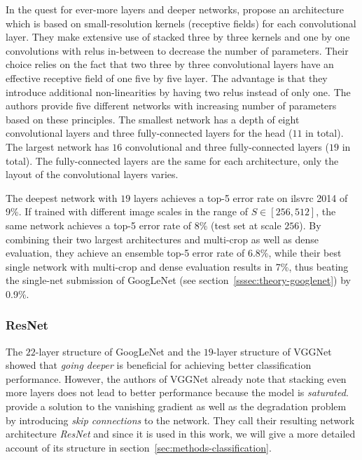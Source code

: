 \documentclass[final]{vutinfth} %
\begin{document}
In the quest for ever-more layers and deeper networks,
\textcite{simonyan2015} propose an architecture which is based on
small-resolution kernels (receptive fields) for each convolutional
layer. They make extensive use of stacked three by three kernels and
one by one convolutions with \glspl{relu} in-between to decrease the
number of parameters. Their choice relies on the fact that two three
by three convolutional layers have an effective receptive field of one
five by five layer. The advantage is that they introduce additional
non-linearities by having two \glspl{relu} instead of only one. The
authors provide five different networks with increasing number of
parameters based on these principles. The smallest network has a depth
of eight convolutional layers and three fully-connected layers for the
head ($11$ in total). The largest network has $16$ convolutional and
three fully-connected layers ($19$ in total). The fully-connected
layers are the same for each architecture, only the layout of the
convolutional layers varies.

The deepest network with $19$ layers achieves a top-5 error rate on
\gls{ilsvrc} 2014 of 9\%. If trained with different image scales in
the range of $S \in [256, 512]$, the same network achieves a top-5 error
rate of 8\% (test set at scale $256$). By combining their two largest
architectures and multi-crop as well as dense evaluation, they achieve
an ensemble top-5 error rate of 6.8\%, while their best single network
with multi-crop and dense evaluation results in 7\%, thus beating the
single-net submission of GoogLeNet (see
section~\ref{sssec:theory-googlenet}) by 0.9\%.

\subsubsection{ResNet}
\label{sssec:theory-resnet}

The $22$-layer structure of GoogLeNet \cite{szegedy2015} and the
$19$-layer structure of VGGNet \cite{simonyan2015} showed that
\emph{going deeper} is beneficial for achieving better classification
performance. However, the authors of VGGNet already note that stacking
even more layers does not lead to better performance because the model
is \emph{saturated}. \textcite{he2016} provide a solution to the
vanishing gradient as well as the degradation problem by introducing
\emph{skip connections} to the network. They call their resulting
network architecture \emph{ResNet} and since it is used in this work,
we will give a more detailed account of its structure in
section~\ref{sec:methods-classification}.
\end{document}
